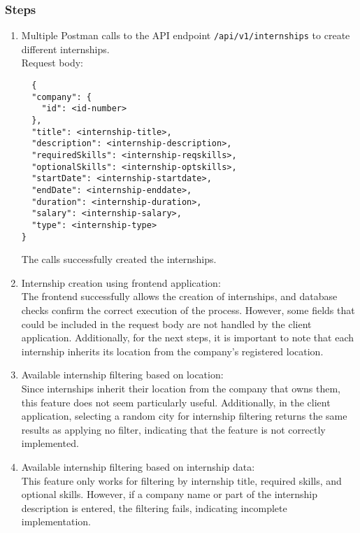 \subsubsection*{Steps}
\begin{enumerate}
    \item Multiple Postman calls to the API endpoint \verb|/api/v1/internships| to create different internships.\\
    Request body:
    \begin{verbatim}
  {
  "company": {
    "id": <id-number>
  },
  "title": <internship-title>,
  "description": <internship-description>,
  "requiredSkills": <internship-reqskills>,
  "optionalSkills": <internship-optskills>,
  "startDate": <internship-startdate>,
  "endDate": <internship-enddate>,
  "duration": <internship-duration>,
  "salary": <internship-salary>,
  "type": <internship-type>
}
    \end{verbatim}
    The calls successfully created the internships.
    
    \item Internship creation using frontend application:\\
    The frontend successfully allows the creation of internships, and database checks confirm the correct execution of the process. However, some fields that could be included in the request body are not handled by the client application. Additionally, for the next steps, it is important to note that each internship inherits its location from the company’s registered location.
    
    \item Available internship filtering based on location:    \\ 
    Since internships inherit their location from the company that owns them, this feature does not seem particularly useful. Additionally, in the client application, selecting a random city for internship filtering returns the same results as applying no filter, indicating that the feature is not correctly implemented.
    
    \item Available internship filtering based on internship data:\\
   This feature only works for filtering by internship title, required skills, and optional skills. However, if a company name or part of the internship description is entered, the filtering fails, indicating incomplete implementation.
    
\end{enumerate}
